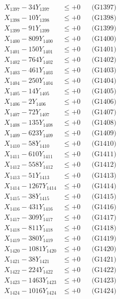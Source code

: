 \documentclass[a4paper,10pt]{article}
\begin{document}
{\begin{align}
X_{1397} - 34Y_{1397} &\leq +0 && \text{(G1397)} \\
X_{1398} - 10Y_{1398} &\leq +0 && \text{(G1398)} \\
X_{1399} - 91Y_{1399} &\leq +0 && \text{(G1399)} \\
X_{1400} - 809Y_{1400} &\leq +0 && \text{(G1400)} \\
\allowbreak
X_{1401} - 150Y_{1401} &\leq +0 && \text{(G1401)} \\
X_{1402} - 764Y_{1402} &\leq +0 && \text{(G1402)} \\
X_{1403} - 461Y_{1403} &\leq +0 && \text{(G1403)} \\
X_{1404} - 250Y_{1404} &\leq +0 && \text{(G1404)} \\
X_{1405} - 14Y_{1405} &\leq +0 && \text{(G1405)} \\
X_{1406} - 2Y_{1406} &\leq +0 && \text{(G1406)} \\
X_{1407} - 72Y_{1407} &\leq +0 && \text{(G1407)} \\
X_{1408} - 135Y_{1408} &\leq +0 && \text{(G1408)} \\
X_{1409} - 623Y_{1409} &\leq +0 && \text{(G1409)} \\
X_{1410} - 58Y_{1410} &\leq +0 && \text{(G1410)} \\
\allowbreak
X_{1411} - 610Y_{1411} &\leq +0 && \text{(G1411)} \\
X_{1412} - 558Y_{1412} &\leq +0 && \text{(G1412)} \\
X_{1413} - 51Y_{1413} &\leq +0 && \text{(G1413)} \\
X_{1414} - 1267Y_{1414} &\leq +0 && \text{(G1414)} \\
X_{1415} - 38Y_{1415} &\leq +0 && \text{(G1415)} \\
X_{1416} - 431Y_{1416} &\leq +0 && \text{(G1416)} \\
X_{1417} - 309Y_{1417} &\leq +0 && \text{(G1417)} \\
X_{1418} - 811Y_{1418} &\leq +0 && \text{(G1418)} \\
X_{1419} - 380Y_{1419} &\leq +0 && \text{(G1419)} \\
X_{1420} - 1081Y_{1420} &\leq +0 && \text{(G1420)} \\
\allowbreak
X_{1421} - 38Y_{1421} &\leq +0 && \text{(G1421)} \\
X_{1422} - 224Y_{1422} &\leq +0 && \text{(G1422)} \\
X_{1423} - 1463Y_{1423} &\leq +0 && \text{(G1423)} \\
X_{1424} - 1016Y_{1424} &\leq +0 && \text{(G1424)} \\

\end{align}}
\end{document}
